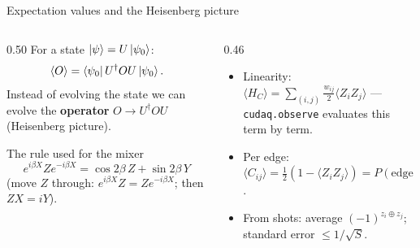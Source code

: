 \documentclass[aspectratio=169,11pt]{beamer}
\newcommand{\key}[1]{{\color{qdark}\textbf{#1}}}
\begin{document}
\begin{frame}{Expectation values and the Heisenberg picture}
  \begin{columns}[T]
    \begin{column}{0.50\textwidth}
      For a state $\ket\psi = U\ket{\psi_0}$:
      \[ \langle O\rangle = \bra{\psi_0}U^\dagger O U\ket{\psi_0} . \]
      Instead of evolving the state we can evolve the \key{operator} $O \to U^\dagger OU$ (Heisenberg picture).
      \begin{block}{The rule used for the mixer}
        \[ e^{i\beta X}Ze^{-i\beta X} = \cos2\beta\, Z + \sin2\beta\, Y \]
        (move $Z$ through: $e^{i\beta X}Z = Ze^{-i\beta X}$; then $ZX = iY$).
      \end{block}
    \end{column}
    \begin{column}{0.46\textwidth}
      \begin{itemize}
        \item Linearity: $\langle H_C\rangle = \sum_{(i,j)}\frac{w_{ij}}{2}\langle Z_iZ_j\rangle$ --- \texttt{cudaq.observe} evaluates
          this term by term.
        \item Per edge: $\langle C_{ij}\rangle = \tfrac12(1 - \langle Z_iZ_j\rangle) = P(\text{edge cut})$.
        \item From shots: average $(-1)^{z_i\oplus z_j}$; standard error $\le 1/\sqrt{S}$.
      \end{itemize}
    \end{column}
  \end{columns}
\end{frame}

\end{document}
